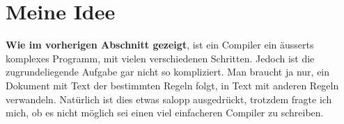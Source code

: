 \chapter{Meine Idee}
\textbf{Wie im vorherigen Abschnitt gezeigt}, ist ein Compiler ein äusserts komplexes Programm, mit vielen verschiedenen Schritten. Jedoch ist die zugrundeliegende Aufgabe gar nicht so kompliziert.
Man braucht ja nur, ein Dokument mit Text der bestimmten Regeln folgt, in Text mit anderen Regeln verwandeln. Natürlich ist dies etwas salopp ausgedrückt, trotzdem fragte ich mich,
ob es nicht möglich sei einen viel einfacheren Compiler zu schreiben. 